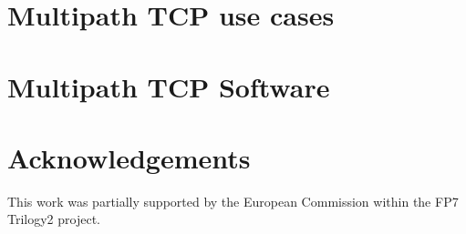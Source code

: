 \documentclass{article}
\begin{document}


\section{Multipath TCP use cases}\label{section:usecases}



\section{Multipath TCP Software}\label{section:software}



\section*{Acknowledgements}

This work was partially supported by the European Commission within the FP7 Trilogy2 project.



\end{document}

